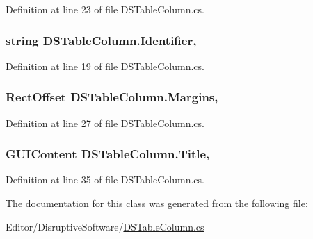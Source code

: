 Definition at line 23 of file D\+S\+Table\+Column.\+cs.

\hypertarget{class_d_s_table_column_aae185a69d6fae35e72bcf9a2c689a7ce}{
\subsubsection[{Identifier}]{\setlength{\rightskip}{0pt plus 5cm}string D\+S\+Table\+Column.\+Identifier\hspace{0.3cm}{\ttfamily [get]}, {\ttfamily [set]}}}\label{class_d_s_table_column_aae185a69d6fae35e72bcf9a2c689a7ce}


Definition at line 19 of file D\+S\+Table\+Column.\+cs.

\hypertarget{class_d_s_table_column_aeec7c3f50e4bb3b6c7f71c4f39200bde}{
\subsubsection[{Margins}]{\setlength{\rightskip}{0pt plus 5cm}Rect\+Offset D\+S\+Table\+Column.\+Margins\hspace{0.3cm}{\ttfamily [get]}, {\ttfamily [set]}}}\label{class_d_s_table_column_aeec7c3f50e4bb3b6c7f71c4f39200bde}


Definition at line 27 of file D\+S\+Table\+Column.\+cs.

\hypertarget{class_d_s_table_column_ace0d678efe1f5fdd5d43243fc7904fa4}{
\subsubsection[{Title}]{\setlength{\rightskip}{0pt plus 5cm}G\+U\+I\+Content D\+S\+Table\+Column.\+Title\hspace{0.3cm}{\ttfamily [get]}, {\ttfamily [set]}}}\label{class_d_s_table_column_ace0d678efe1f5fdd5d43243fc7904fa4}


Definition at line 35 of file D\+S\+Table\+Column.\+cs.



The documentation for this class was generated from the following file\+:\begin{DoxyCompactItemize}
\item 
Editor/\+Disruptive\+Software/\hyperlink{_d_s_table_column_8cs}{D\+S\+Table\+Column.\+cs}\end{DoxyCompactItemize}
